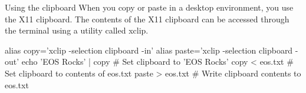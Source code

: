 \begin{block}{Using the clipboard}
  When you copy or paste in a desktop environment, you use the X11 clipboard. The contents of the X11 clipboard can be accessed through the terminal using a utility called xclip.
  \begin{indented}
    \begin{bashcode}
      alias copy='xclip -selection clipboard -in'
      alias paste='xclip -selection clipboard -out'
      echo 'EOS Rocks' | copy # Set clipboard to 'EOS Rocks'
      copy < eos.txt          # Set clipboard to contents of eos.txt
      paste > eos.txt         # Write clipboard contents to eos.txt
    \end{bashcode}
  \end{indented}
\end{block}
